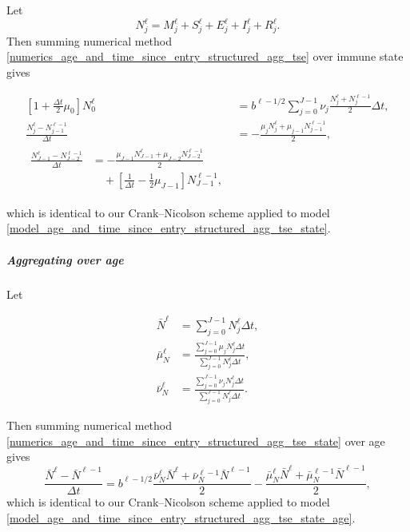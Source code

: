 \documentclass{jpmarticle}
\let\subequationsorig\subequations%
\let\endsubequationsorig\endsubequations%
\renewenvironment{subequations}{
  \subequationsorig
  \renewcommand{\theequation}{\theparentequation.\arabic{equation}}
}{
  \endsubequationsorig
}
\begin{document}
Let
\begin{equation}
  N_j^{\ell}
  = M_j^{\ell} + S_j^{\ell} + E_j^{\ell} + I_j^{\ell} + R_j^{\ell}.
\end{equation}
Then summing numerical method
\eqref{numerics_age_and_time_since_entry_structured_agg_tse} over
immune state gives
\begin{subequations}
  \label{numerics_age_and_time_since_entry_structured_agg_tse_state}
  \begin{align}
    \left[1 + \frac{\Delta t}{2} \mu_0\right] N_0^{\ell}
    &= b^{\ell - 1 / 2}
    \sum_{j = 0}^{J - 1} \nu_j \frac{N_j^{\ell} + N_j^{\ell - 1}}{2}
    \Delta t,
    \\
    \frac{N_j^{\ell} - N_{j - 1}^{\ell - 1}}{\Delta t}
    &= - \frac{\mu_j N_j^{\ell} + \mu_{j - 1} N_{j - 1}^{\ell - 1}}{2},
    \\
    \begin{split}
      \frac{N_{J - 1}^{\ell} - N_{J - 2}^{\ell - 1}}{\Delta t}
      &= - \frac{\mu_{J - 1} N_{J - 1}^{\ell}
        + \mu_{J - 2} N_{J - 2}^{\ell - 1}}
      {2}
      \\ & \quad {}
      + \left[\frac{1}{\Delta t} - \frac{1}{2} \mu_{J - 1}\right]
      N_{J - 1}^{\ell - 1},
    \end{split}
  \end{align}
\end{subequations}
which is identical to our Crank--Nicolson scheme applied to model
\eqref{model_age_and_time_since_entry_structured_agg_tse_state}.


\subparagraph{Aggregating over age}

Let
\begin{subequations}
  \begin{align}
    \bar{N}^{\ell}
    &= \sum_{j = 0}^{J - 1} N_j^{\ell} \Delta t,
    \\
    \bar{\mu}_N^{\ell}
    &= \frac{\sum_{j = 0}^{J - 1} \mu_j N_j^{\ell} \Delta t}
    {\sum_{j = 0}^{J - 1} N_j^{\ell} \Delta t},
    \\
    \bar{\nu}_N^{\ell}
    &= \frac{\sum_{j = 0}^{J - 1} \nu_j N_j^{\ell} \Delta t}
    {\sum_{j = 0}^{J - 1} N_j^{\ell} \Delta t}.
  \end{align}
\end{subequations}
Then summing numerical method
\eqref{numerics_age_and_time_since_entry_structured_agg_tse_state}
over age gives
\begin{equation}
  \label{numerics_age_and_time_since_entry_structured_agg_tse_state_age}
  \frac{\bar{N}^{\ell} - \bar{N}^{\ell - 1}}{\Delta t}
  = b^{\ell - 1 / 2} \frac{\bar{\nu}_N^{\ell} \bar{N}^{\ell}
    + \bar{\nu}_N^{\ell - 1} \bar{N}^{\ell - 1}}{2}
  - \frac{\bar{\mu}_N^{\ell} \bar{N}^{\ell}
    + \bar{\mu}_N^{\ell - 1} \bar{N}^{\ell - 1}}{2},
\end{equation}
which is identical to our Crank--Nicolson scheme applied to model
\eqref{model_age_and_time_since_entry_structured_agg_tse_state_age}.
\end{document}
